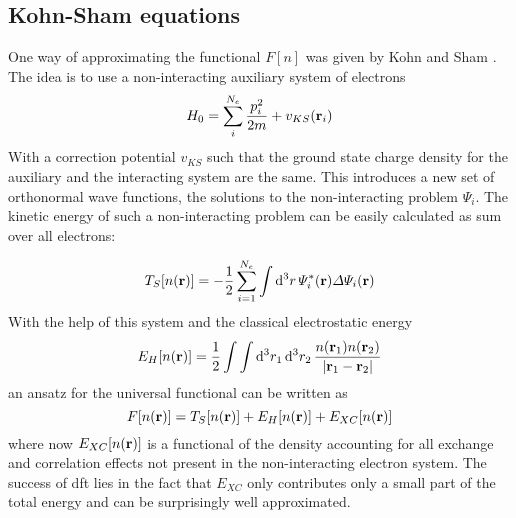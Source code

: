 \documentclass[main.tex]{subfiles}
\begin{document}
\subsection{Kohn-Sham equations}

One way of approximating the functional \(F[n]\) was given by Kohn and Sham \cite{kohn_self-consistent_1965}.
The idea is to use a non-interacting auxiliary system of electrons 
\begin{equation}
    H_0 = \sum_i^{N_e} \frac{p_i^2}{2m} + v_{KS} (\vb{r}_i)
\end{equation}
With a correction potential \(v_{KS}\) such that the ground state charge density for the auxiliary and the interacting system are the same.
This introduces a new set of orthonormal wave functions, the solutions to the non-interacting problem \(\Psi_i\).
The kinetic energy of such a non-interacting problem can be easily calculated as sum over all electrons:


\begin{equation}
    T_S [n(\vb{r})] = - \frac{1}{2} \sum_{i=1}^{N_e} \int \dd[3]{r} \Psi_i^* (\vb{r}) \Delta \Psi_i (\vb{r})
\end{equation}
With the help of this system and the classical electrostatic energy 
\begin{equation}
    E_H [n(\vb{r})] = \frac{1}{2} \int \int \dd[3]{r_1} \dd[3]{r_2} \frac{n(\vb{r}_1) n(\vb{r}_2)}{\vert \vb{r}_1 - \vb{r}_2 \vert}
\end{equation}
an ansatz for the universal functional can be written as
\begin{equation}
    F[n(\vb{r})] = T_S [n(\vb{r})] + E_H [n(\vb{r})] + E_{XC} [n(\vb{r})]
\end{equation}
where now \(E_{XC} [n(\vb{r})]\) is a functional of the density accounting for all exchange and correlation effects not present in the non-interacting electron system.
The success of \acrshort{dft} lies in the fact that \(E_{XC}\) only contributes only a small part of the total energy and can be surprisingly well approximated.
\end{document}
